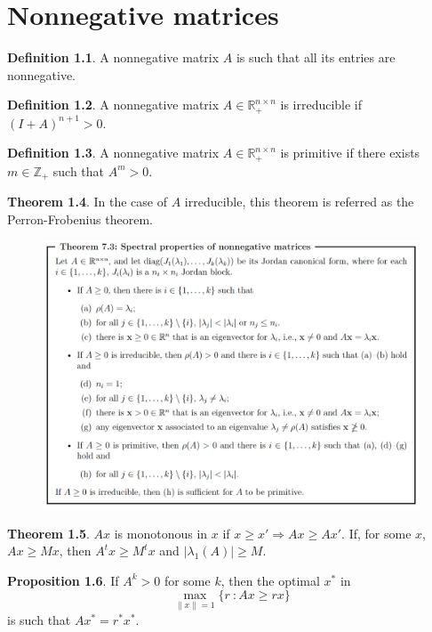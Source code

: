 \documentclass[12pt, openany]{report}
\theoremstyle{definition}
\newtheorem{thm}{Theorem}[chapter]
\newtheorem{definition}[thm]{Definition}
\newtheorem{proposition}[thm]{Proposition}
\newcommand{\R}{\mathbb{R}}
\begin{document}
\chapter{Nonnegative matrices}
\begin{definition}
    A nonnegative matrix $A$ is such that all its entries are nonnegative.
\end{definition}
\begin{definition}
    A nonnegative matrix $A\in \R_+^{n\times n}$ is irreducible if $(I+A)^{n+1} >0$.
\end{definition}
\begin{definition}
    A nonnegative matrix $A\in \R_+^{n\times n}$ is primitive if there exists $m\in \mathbb{Z}_+$ such that $A^m>0$.
\end{definition}
\begin{thm}
    In the case of $A$ irreducible, this theorem is referred as the Perron-Frobenius theorem.
    \begin{figure}[H]
        \centering
        \includegraphics[width=\textwidth]{img/nonnegative_matrices.png}
    \end{figure}
\end{thm}
\begin{thm}
    $Ax$ is monotonous in $x$ if $x\ge x'\Longrightarrow Ax\ge Ax'$. If, for some $x$, $Ax\ge Mx$, then $A^tx\ge M^tx$ and $|\lambda_1(A)|\ge M$.
\end{thm}
\begin{proposition}
    If $A^k>0$ for some $k$, then the optimal $x^*$ in 
    \begin{equation}
        \max_{\lVert x\rVert = 1} \{r\: :Ax\ge rx\}
    \end{equation}
    is such that $Ax^* = r^*x^*$. 
\end{proposition}
\end{document}
